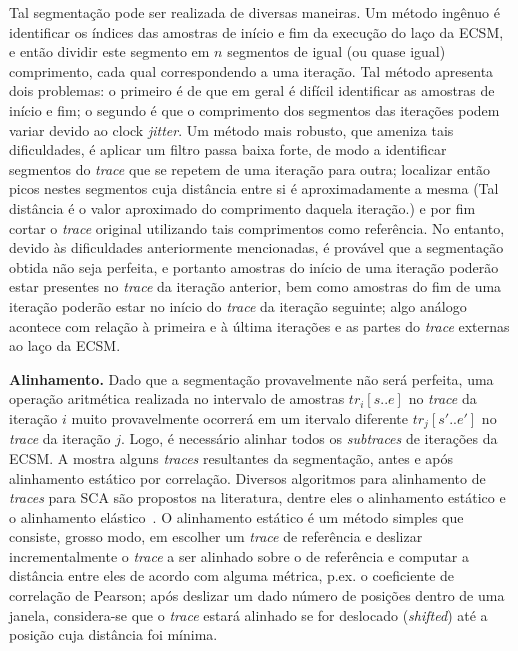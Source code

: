 \documentclass{SBCbookchapter}
\begin{document}
\noindent Tal segmentação pode ser realizada de diversas maneiras. Um método ingênuo é identificar os índices das amostras de início e fim da execução do laço da ECSM, e então dividir este segmento em $n$ segmentos de igual (ou quase igual) comprimento, cada qual correspondendo a uma iteração. Tal método apresenta dois problemas: o primeiro é de que em geral é difícil identificar as amostras de início e fim; o segundo é que o comprimento dos segmentos das iterações podem variar devido ao clock \emph{jitter}. Um método mais robusto, que ameniza tais dificuldades, é aplicar um filtro passa baixa forte, de modo a identificar segmentos do \emph{trace} que se repetem de uma iteração para outra; localizar então picos nestes segmentos cuja distância entre si é aproximadamente a mesma (Tal distância é o valor aproximado do comprimento daquela iteração.) e por fim cortar o \emph{trace} original utilizando tais comprimentos como referência. No entanto, devido às dificuldades anteriormente mencionadas, é provável que a segmentação obtida não seja perfeita, e portanto amostras do início de uma iteração poderão estar presentes no \emph{trace} da iteração anterior, bem como amostras do fim de uma iteração poderão estar no início do \emph{trace} da iteração seguinte; algo análogo acontece com relação à primeira e à última iterações e as partes do \emph{trace} externas ao laço da ECSM.

\noindent \textbf{Alinhamento.} Dado que a segmentação provavelmente não será perfeita, uma operação aritmética realizada no intervalo de amostras $tr_i[s..e]$ no \emph{trace} da iteração $i$ muito provavelmente ocorrerá em um itervalo diferente $tr_j[s'..e']$ no \emph{trace} da iteração $j$. Logo, é necessário alinhar todos os \emph{subtraces} de iterações da ECSM. A  mostra alguns \emph{traces} resultantes da segmentação, antes e após alinhamento estático por correlação. Diversos algoritmos para alinhamento de \emph{traces} para SCA são propostos na literatura, dentre eles o alinhamento estático e o alinhamento elástico~\cite{WoudenbergWittemanBakker2011}. O alinhamento estático é um método simples que consiste, grosso modo, em escolher um \emph{trace} de referência e deslizar incrementalmente o \emph{trace} a ser alinhado sobre o de referência e computar a distância entre eles de acordo com alguma métrica, p.ex. o coeficiente de correlação de Pearson; após deslizar um dado número de posições dentro de uma janela, considera-se que o \emph{trace} estará alinhado se for deslocado (\textit{shifted}) até a posição cuja distância foi mínima.
\end{document}
